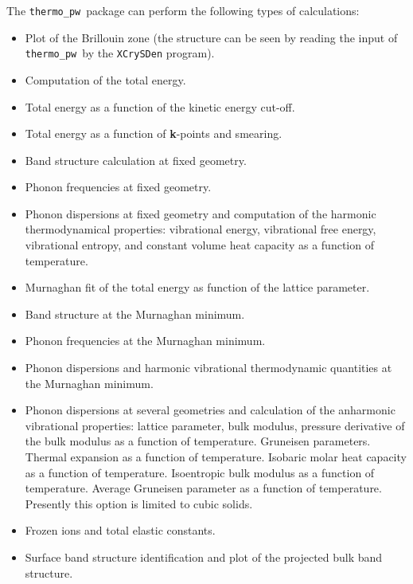 \documentclass[12pt,a4paper]{article}
\def\thermo{\texttt{thermo\_pw}}
\begin{document}
The \thermo\ package can perform the following types of calculations:
\begin{itemize}
\item Plot of the Brillouin zone (the structure can be seen by reading the
input of \thermo\ by the \texttt{XCrySDen} program).

\item Computation of the total energy.

\item Total energy as a function of the kinetic energy cut-off.

\item Total energy as a function of {\bf k}-points and smearing.

\item Band structure calculation at fixed geometry.

\item Phonon frequencies at fixed geometry.

\item Phonon dispersions at fixed geometry and computation of the harmonic
thermodynamical properties: vibrational energy, vibrational free energy,
vibrational entropy, and constant volume heat capacity as a function
of temperature.

\item Murnaghan fit of the total energy as function of the lattice parameter.

\item Band structure at the Murnaghan minimum.

\item Phonon frequencies at the Murnaghan minimum.

\item Phonon dispersions and harmonic vibrational thermodynamic quantities
at the Murnaghan minimum.

\item Phonon dispersions at several geometries and calculation of the
anharmonic vibrational properties: lattice parameter, bulk modulus,
pressure derivative of the bulk modulus as a function of temperature.
Gruneisen parameters. Thermal expansion as a function of temperature.
Isobaric molar heat capacity as a function of temperature.
Isoentropic bulk modulus as a function of temperature.
Average Gruneisen parameter as a function of temperature.
Presently this option is limited to cubic solids.
\item Frozen ions and total elastic constants.

\item Surface band structure identification and plot of the projected bulk
band structure.
\end{itemize}
\end{document}
